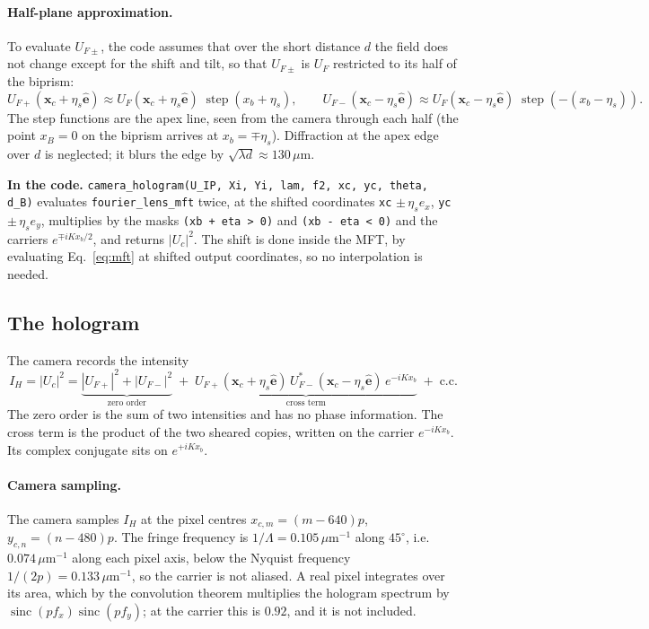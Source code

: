 \documentclass[11pt,a4paper]{article}
\newcommand{\ve}{\hat{\mathbf{e}}}
\newcommand{\um}{\,\mu\mathrm{m}}
\newcommand{\ee}{e}
\newcommand{\sinc}{\operatorname{sinc}}
\newcommand{\step}{\operatorname{step}}
\newcommand{\code}[1]{\texttt{\small #1}}
\newcommand{\incode}[1]{\par\smallskip\noindent\colorbox{black!6}{\parbox{\dimexpr\linewidth-2\fboxsep}{\small\textbf{In the code.} #1}}\par\smallskip}
\begin{document}
\paragraph{Half-plane approximation.}
To evaluate $U_{F\pm}$, the code assumes that over the short distance $d$ the
field does not change except for the shift and tilt, so that $U_{F\pm}$ is
$U_F$ restricted to its half of the biprism:
\begin{equation}
  U_{F+}(\mathbf{x}_c+\eta_s\ve) \approx U_F(\mathbf{x}_c+\eta_s\ve)\;\step(x_b+\eta_s),
  \qquad
  U_{F-}(\mathbf{x}_c-\eta_s\ve) \approx U_F(\mathbf{x}_c-\eta_s\ve)\;\step(-(x_b-\eta_s)).
  \label{eq:halfplane}
\end{equation}
The step functions are the apex line, seen from the camera through each half
(the point $x_B = 0$ on the biprism arrives at $x_b = \mp\eta_s$). Diffraction
at the apex edge over $d$ is neglected; it blurs the edge by
$\sqrt{\lambda d} \approx 130\um$.

\incode{\code{camera\_hologram(U\_IP, Xi, Yi, lam, f2, xc, yc, theta, d\_B)}
evaluates \code{fourier\_lens\_mft} twice, at the shifted coordinates
\code{xc} $\pm\,\eta_s e_x$, \code{yc} $\pm\,\eta_s e_y$, multiplies by the
masks \code{(xb + eta > 0)} and \code{(xb - eta < 0)} and the carriers
$\ee^{\mp iKx_b/2}$, and returns $|U_c|^2$. The shift is done inside the MFT,
by evaluating Eq.~\eqref{eq:mft} at shifted output coordinates, so no
interpolation is needed.}

\subsection{The hologram}

The camera records the intensity
\begin{equation}
  I_H = |U_c|^2
  = \underbrace{|U_{F+}|^2 + |U_{F-}|^2}_{\text{zero order}}
  \;+\; \underbrace{U_{F+}(\mathbf{x}_c+\eta_s\ve)\,U_{F-}^*(\mathbf{x}_c-\eta_s\ve)\,\ee^{-iKx_b}}_{\text{cross term}}
  \;+\;\text{c.c.}
  \label{eq:hologram}
\end{equation}
The zero order is the sum of two intensities and has no phase information.
The cross term is the product of the two sheared copies, written on the
carrier $\ee^{-iKx_b}$. Its complex conjugate sits on $\ee^{+iKx_b}$.

\paragraph{Camera sampling.}
The camera samples $I_H$ at the pixel centres
$x_{c,m} = (m-640)p$, $y_{c,n} = (n-480)p$. The fringe frequency is
$1/\Lambda = 0.105\um^{-1}$ along $45^\circ$, i.e.\ $0.074\um^{-1}$ along each
pixel axis, below the Nyquist frequency $1/(2p) = 0.133\um^{-1}$, so the
carrier is not aliased. A real pixel integrates over its area, which by the
convolution theorem multiplies the hologram spectrum by
$\sinc(pf_x)\sinc(pf_y)$; at the carrier this is $0.92$, and it is not
included.
\end{document}
